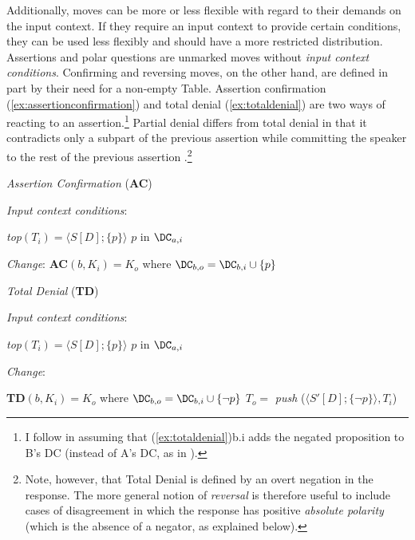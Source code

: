 Additionally, moves can be more or less flexible with regard to their demands on the input context. If they require an input context to provide certain conditions, they can be used less flexibly and should have a more restricted distribution. Assertions and polar questions are unmarked moves without \textit{input context conditions}. Confirming and reversing moves, on the other hand, are defined in part by their need for a non-empty Table. Assertion confirmation (\ref{ex:assertionconfirmation}) and total denial (\ref{ex:totaldenial}) are two ways of reacting to an assertion.\footnote{I follow \citet[14]{Schneider.2017} in assuming that (\ref{ex:totaldenial})b.i adds the negated proposition to B's DC (instead of A's DC, as in \cite[101]{FarkasBruce.2010}).} Partial denial differs from total denial in that it contradicts only a subpart of the previous assertion while committing the speaker to the rest of the previous assertion \citep[101]{FarkasBruce.2010}.\footnote{Note, however, that Total Denial is defined by an overt negation in the response. The more general notion of \textit{reversal} is therefore useful to include cases of disagreement in which the response has positive \textit{absolute polarity} (which is the absence of a negator, as explained below).}

\begin{exe}
\ex\label{ex:assertionconfirmation} \textit{Assertion Confirmation} (\textbf{AC})
	\begin{xlist}
		\ex \textit{Input context conditions}: 
			\begin{xlist}
			\ex \textit{top}$(T_i)=\langle S [D];\{ p \}\rangle$
			\ex $p$ in $\DC_{a,i}$ 
			\end{xlist}
		\ex \textit{Change}: 
			\textbf{AC}$(b,K_i)=K_o$ where $\DC_{b,o}=\DC_{b,i}\cup \{ p \}$ 
	\end{xlist}
\ex\label{ex:totaldenial} \textit{Total Denial} (\textbf{TD}) 
	\begin{xlist}
		\ex \textit{Input context conditions}: 
		\begin{xlist}
			\ex \textit{top}$(T_i)=\langle S [D];\{ p \}\rangle$
			\ex $p$ in $\DC_{a,i}$ 
		\end{xlist}
		\ex \textit{Change}: 
		\begin{xlist}
			\ex \textbf{TD}$(b,K_i)=K_o$ where $\DC_{b,o}=\DC_{b,i}\cup \{\neg p \}$ 
			\ex $T_o=$ \textit{push} ($\langle S' [D];\{\neg p \}\rangle, T_i$) 
		\end{xlist}
	\end{xlist}
\end{exe}

